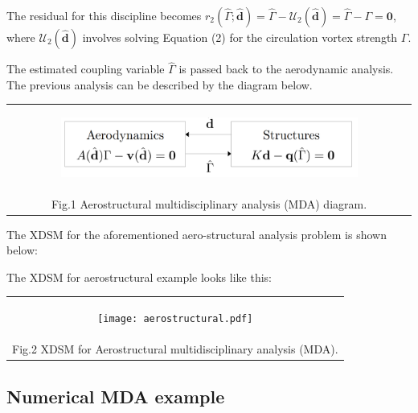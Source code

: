 \documentclass[11pt]{article}
\begin{document}
The residual for this discipline becomes
\(r_2(\hat{\Gamma};\hat{\mathbf{d}}) = \hat{\Gamma} - \mathcal{U}_2(\hat{\mathbf{d}}) = \hat{\Gamma} - {\Gamma} = \mathbf{0}\),
where \(\mathcal{U}_2(\hat{\mathbf{d}})\) involves solving Equation (2)
for the circulation vortex strength \(\Gamma\).

The estimated coupling variable \(\hat{\Gamma}\) is passed back to the
aerodynamic analysis. The previous analysis can be described by the
diagram below.

\begin{longtable}[]{@{}c@{}}
\toprule
\endhead
\begin{minipage}[t]{0.97\columnwidth}\centering
    \begin{figure}
        \centering
        \includegraphics[width=0.9\textwidth]{images/MDA_diagram_aero.png}
    \end{figure}\strut
\end{minipage}\tabularnewline
Fig.1 Aerostructural multidisciplinary analysis (MDA)
diagram.\tabularnewline
\bottomrule
\end{longtable}

The XDSM for the aforementioned aero-structural analysis problem is
shown below:

The XDSM for aerostructural example looks like this:

\begin{longtable}[]{@{}c@{}}
\toprule
\endhead
\begin{minipage}[t]{0.97\columnwidth}\centering
    \begin{figure}
        \centering
        \texttt{[image: aerostructural.pdf]}
    \end{figure}\strut
\end{minipage}\tabularnewline
Fig.2 XDSM for Aerostructural multidisciplinary analysis
(MDA).\tabularnewline
\bottomrule
\end{longtable}

    \hypertarget{numerical-mda-example}{%
\subsection{Numerical MDA example}\label{numerical-mda-example}}
\end{document}
